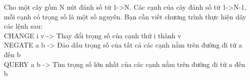 Cho một cây gồm N nút đánh số từ 1->N. Các cạnh của cây đánh số từ 1->N-1, mỗi cạnh có trọng số là một số nguyên. Bạn cần viết chương trình thực hiện dãy các lệnh sau:   
\\   CHANGE i v -> Thay đổi trọng số của cạnh thứ i thành v   
\\   NEGATE a b -> Đảo dấu trọng số của tất cả các cạnh nằm trên đường đi từ a đến b   
\\   QUERY a b -> Tìm trọng số lớn nhất của các cạnh nằm trên đường đi từ a đến b